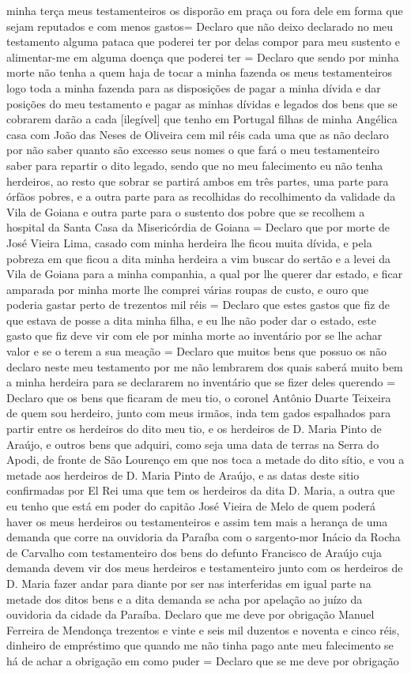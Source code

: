 \begin{refsection}
minha terça meus testamenteiros os disporão em praça ou fora dele em forma que sejam reputados e com menos gastos= Declaro que não deixo declarado no meu testamento alguma pataca que poderei ter por delas compor para meu sustento e alimentar-me em alguma doença que poderei ter = Declaro que sendo por minha morte não tenha a quem haja de tocar a minha fazenda os meus testamenteiros logo toda a minha fazenda para as disposições de pagar a minha dívida e dar posições do meu testamento e pagar as minhas dívidas e legados dos bens que se cobrarem darão a cada [ilegível] que tenho em Portugal filhas de minha Angélica casa com João das Neses de  Oliveira cem mil réis cada uma que as não declaro por não saber quanto são excesso seus nomes o que fará o meu testamenteiro saber para repartir o dito legado, sendo que no meu falecimento eu não tenha herdeiros, ao resto que sobrar se partirá ambos em três partes, uma parte para órfãos pobres, e a outra parte para as recolhidas do recolhimento da validade da Vila de Goiana e outra parte para o sustento dos pobre que se recolhem a hospital da Santa Casa da Misericórdia de Goiana = Declaro que por morte de José Vieira Lima, casado com minha herdeira lhe ficou muita dívida, e pela pobreza em que ficou a dita minha herdeira a vim buscar do sertão e a levei da Vila de Goiana para a minha companhia, a qual por lhe querer dar estado, e ficar amparada por minha morte lhe comprei várias roupas de custo, e ouro que poderia gastar perto de trezentos mil réis = Declaro que estes gastos que fiz de que estava de posse a dita minha filha, e eu lhe não poder dar o estado, este gasto que fiz deve vir com ele por minha morte ao inventário por se lhe achar valor e se o terem a sua meação = Declaro que muitos bens que possuo os não declaro neste meu testamento por me não lembrarem dos quais saberá muito bem a minha herdeira para se declararem no inventário que se fizer deles querendo = Declaro que os bens que ficaram de meu tio, o coronel Antônio Duarte Teixeira de quem sou herdeiro, junto com meus irmãos, inda tem gados espalhados para partir entre os herdeiros do dito meu tio, e os herdeiros de D. Maria Pinto de Araújo, e outros bens que adquiri, como seja uma data de terras na Serra do Apodi, de fronte de São Lourenço em que nos toca a metade do dito sítio, e vou a metade aos herdeiros de D. Maria Pinto de Araújo, e as datas deste sitio confirmadas por El Rei uma que tem os herdeiros da dita D. Maria, a outra que eu tenho que está em poder do capitão José Vieira de Melo de quem poderá haver os meus herdeiros ou testamenteiros e assim tem mais a herança de uma demanda que corre na ouvidoria da Paraíba com o sargento-mor Inácio da Rocha de Carvalho com  testamenteiro dos bens do defunto Francisco de Araújo cuja demanda devem vir dos meus herdeiros e testamenteiro junto com os herdeiros de D. Maria fazer andar para diante por ser nas interferidas em igual parte na metade dos ditos bens e a dita demanda se acha por apelação ao juízo da ouvidoria da cidade da Paraíba. Declaro que me deve por obrigação Manuel Ferreira de Mendonça trezentos e vinte e seis mil duzentos e noventa e cinco réis, dinheiro de empréstimo que quando me não tinha pago ante meu falecimento se há de achar a obrigação em como puder = Declaro que se me deve por obrigação 
\end{refsection}
